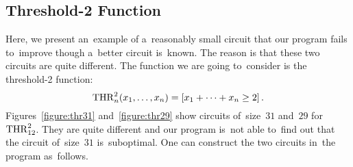 \subsection{Threshold-2 Function}
Here, we present an~example of a~reasonably small circuit
that our program fails to~improve though a~better circuit
is~known. The reason is that these two circuits are quite
different. The function we are going to~consider is the threshold-2 function:
\[\operatorname{THR}_n^2(x_1, \dotsc, x_n)=[x_1+\dotsb+x_n \ge 2] \, .\]
Figures~\ref{figure:thr31} and~\ref{figure:thr29} show circuits of~size~$31$ and~$29$ for $\operatorname{THR}_{12}^2$.
They are
quite different and our program is~not able to~find out
that the circuit
of~size~$31$ is~suboptimal.
One can construct the two circuits in~the program as~follows.

\inputminted[firstline=90,lastline=96]{python}{../tutorial.py}

